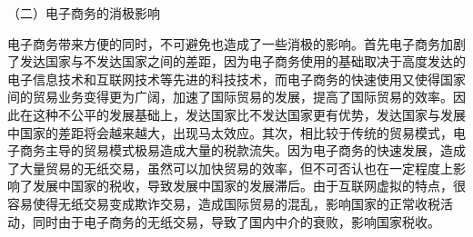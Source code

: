 （二）电子商务的消极影响

电子商务带来方便的同时，不可避免也造成了一些消极的影响。首先电子商务加剧了发达国家与不发达国家之间的差距，因为电子商务使用的基础取决于高度发达的电子信息技术和互联网技术等先进的科技技术，而电子商务的快速使用又使得国家间的贸易业务变得更为广阔，加速了国际贸易的发展，提高了国际贸易的效率。因此在这种不公平的发展基础上，发达国家比不发达国家更有优势，发达国家与发展中国家的差距将会越来越大，出现马太效应。其次，相比较于传统的贸易模式，电子商务主导的贸易模式极易造成大量的税款流失。因为电子商务的快速发展，造成了大量贸易的无纸交易，虽然可以加快贸易的效率，但不可否认也在一定程度上影响了发展中国家的税收，导致发展中国家的发展滞后。由于互联网虚拟的特点，很容易使得无纸交易变成欺诈交易，造成国际贸易的混乱，影响国家的正常收税活动，同时由于电子商务的无纸交易，导致了国内中介的衰败，影响国家税收。 

 